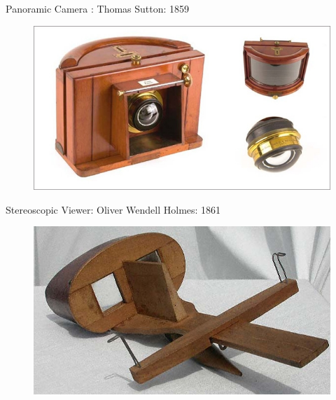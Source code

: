 \documentclass{beamer}
\begin{document}
\begin{frame}{Panoramic Camera : Thomas Sutton: 1859}
	\begin{figure}
		\centering
		\includegraphics[scale=0.4]{124.jpg}
	\end{figure}
\end{frame}

	\begin{frame}{Stereoscopic Viewer: Oliver Wendell Holmes: 1861}
		\begin{figure}
			\centering
			\includegraphics[scale=0.4]{125.jpg}
		\end{figure}
	\end{frame}

	
\end{document}
